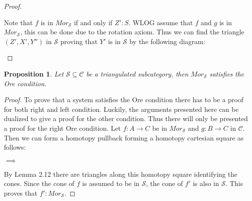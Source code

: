\documentclass[11pt]{article}
\newtheorem{prop}[theorem]{Proposition}
\theoremstyle{definition}
\theoremstyle{remark}
\begin{document}
\begin{proof}
\begin{center}
                \end{center}
                Note that $f$ is in $Mor_\mathcal{S}$ if and only if $Z' : S$. WLOG assume that $f$ and $g$ is in $Mor_\mathcal{S}$, this can be done due to the rotation axiom. Thus we can find the triangle $(Z',X',Y'')$ in $\mathcal{S}$ proving that $Y'$ is in $\mathcal{S}$ by the following diagram:
                \begin{center}
                \end{center}
            \end{proof}

            \begin{prop}
                Let $\mathcal{S}\subseteq\mathcal{C}$ be a triangulated subcategory, then $Mor_\mathcal{S}$ satisfies the Ore condition.
            \end{prop}

            \begin{proof}
                To prove that a system satisfies the Ore condition there has to be a proof for both right and left condition. Luckily, the arguments presented here can be dualized to give a proof for the other condition. Thus there will only be presented a proof for the right Ore condition.
                Let $f:A\rightarrow C$ be in $Mor_\mathcal{S}$ and $g:B\rightarrow C$ in $\mathcal{C}$. Then we can form a homotopy pullback forming a homotopy cartesian square as follows:
                \begin{center}
                    $\implies$
                \end{center}
                By Lemma 2.12 there are triangles along this homotopy square identifying the cones. Since the cone of $f$ is assumed to be in $\mathcal{S}$, the cone of $f'$ is also in $\mathcal{S}$. This proves that $f':Mor_\mathcal{S}$.
            \end{proof}
\end{document}
